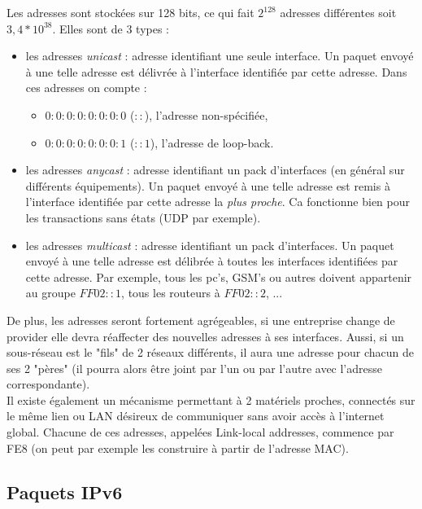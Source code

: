 \documentclass{article}
\newcommand{\term}[1]{\textit{\textcolor{maintitle}{#1}}}
\begin{document}
\begin{sffamily}
Les adresses sont stockées sur 128 bits, ce qui fait $2^{128}$ adresses différentes soit $3,4 * 10^{38}$. Elles sont de $3$ 
types :
\begin{itemize}
\item les adresses \term{unicast} : adresse identifiant une seule interface. Un paquet envoyé à une telle adresse est délivrée à 
l'interface identifiée par cette adresse. Dans ces adresses on compte : \\
\begin{itemize}
\item $0:0:0:0:0:0:0:0$ ($::$), l'adresse non-spécifiée,
\item $0:0:0:0:0:0:0:1$ ($::1$), l'adresse de loop-back.
\end{itemize}
\item les adresses \term{anycast} : adresse identifiant un pack d'interfaces (en général sur différents équipements). Un paquet 
envoyé à une telle adresse est remis à l'interface identifiée par cette adresse la \textit{plus proche}. Ca fonctionne bien 
pour les transactions sans états (UDP par exemple).
\item les adresses \term{multicast} : adresse identifiant un pack d'interfaces. Un paquet envoyé à une telle adresse est 
délibrée à toutes les interfaces identifiées par cette adresse. Par exemple, tous les pc's, GSM's ou autres doivent appartenir 
au groupe $FF02::1$, tous les routeurs à $FF02::2$,  ... \\
\end{itemize}

De plus, les adresses seront fortement agrégeables, si une entreprise change de provider elle devra réaffecter des nouvelles 
adresses à ses interfaces. Aussi, si un sous-réseau est le "fils" de 2 réseaux différents, il aura une adresse pour chacun de 
ses 2 "pères" (il pourra alors être joint par l'un ou par l'autre avec l'adresse correspondante). \\

Il existe également un mécanisme permettant à 2 matériels proches, connectés sur le même lien ou LAN désireux de communiquer 
sans avoir accès à l'internet global. Chacune de ces adresses, appelées Link-local addresses, commence par FE8 (on peut par 
exemple les construire à partir de l'adresse MAC).

\subsection{Paquets IPv6}


\end{sffamily}
\end{document}
